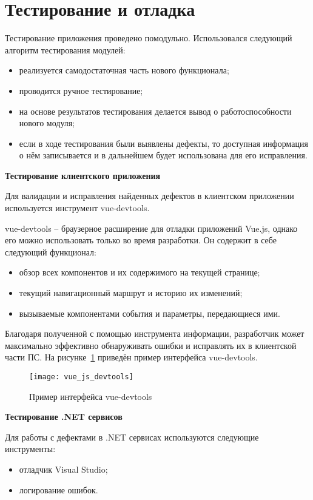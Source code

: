 \section{Тестирование и отладка}\label{sec:manual}

Тестирование приложения проведено помодульно. Использовался следующий алгоритм тестирования модулей:
\begin{itemize}
    \item реализуется самодостаточная часть нового функционала;
    \item проводится ручное тестирование;
    \item на основе результатов тестирования делается вывод о работоспособности нового модуля;
    \item если в ходе тестирования были выявлены дефекты, то доступная информация о нём записывается и в дальнейшем будет использована для его исправления.
\end{itemize}

\bigskip
\textbf{Тестирование клиентского приложения}

Для валидации и исправления найденных дефектов в клиентском приложении используется инструмент vue-devtools.

vue-devtools – браузерное расширение для отладки приложений Vue.js, однако его можно использовать только во время разработки. Он содержит в себе следующий функционал:
\begin{itemize}
    \item обзор всех компонентов и их содержимого на текущей странице;
    \item текущий навигационный маршрут и историю их изменений;
    \item вызываемые компонентами события и параметры, передающиеся ими.
\end{itemize}

Благодаря полученной с помощью инструмента информации, разработчик может максимально эффективно обнаруживать ошибки и исправлять их в клиентской части ПС. На рисунке~\ref{fig:vue_js_devtools} приведён пример интерфейса vue-devtools.

\begin{figure}[h]
    \centering
    \texttt{[image: vue\_js\_devtools]}
    \caption{Пример интерфейса vue-devtools}\label{fig:vue_js_devtools}
\end{figure}

\bigskip
\textbf{Тестирование .NET сервисов}

Для работы с дефектами в .NET сервисах используются следующие инструменты:
\begin{itemize}
    \item отладчик Visual Studio;
    \item логирование ошибок.
\end{itemize}

